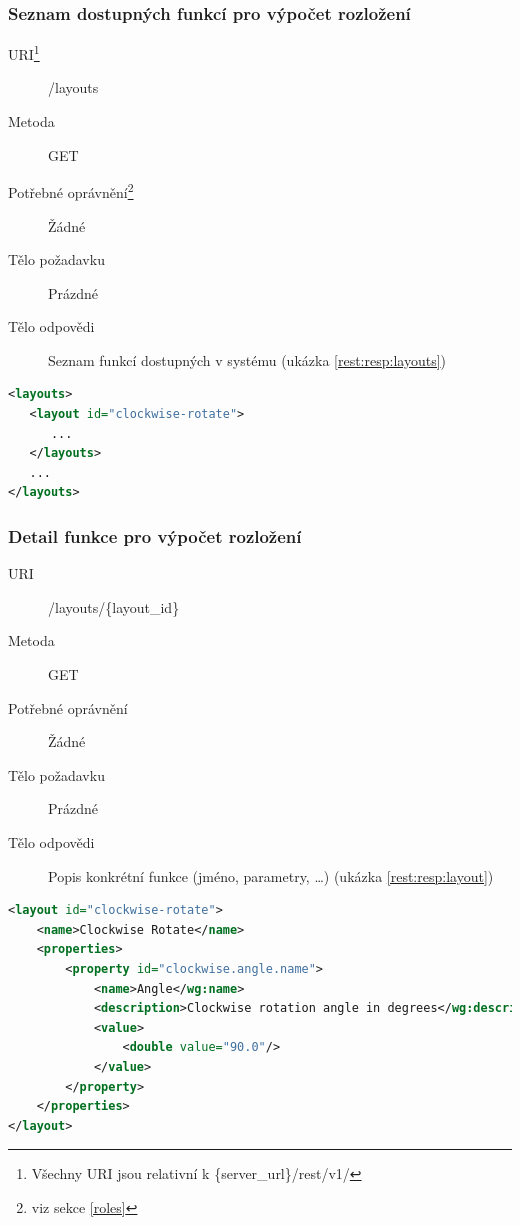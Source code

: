 \documentclass[thesis=M,czech]{FITthesis}[2014/05/6]
\begin{document}
\subsubsection{Seznam dostupných funkcí pro výpočet rozložení}
\begin{description}
  \item[URI\footnote{Všechny URI jsou relativní k \{server\_url\}/rest/v1/}] /layouts
  \item[Metoda] GET
  \item[Potřebné oprávnění\footnote{viz sekce \ref{roles}}] Žádné
  \item[Tělo požadavku] Prázdné
  \item[Tělo odpovědi] Seznam  funkcí dostupných v systému (ukázka \ref{rest:resp:layouts})
\end{description}

\begin{lstlisting}[caption=Tělo odpovědi zdroje /layouts (GET), label=rest:resp:layouts, language=xml]
<layouts>
   <layout id="clockwise-rotate">
      ...
   </layouts>
   ...
</layouts>
\end{lstlisting}  

\subsubsection{Detail funkce pro výpočet rozložení}
\begin{description}
  \item[URI] /layouts/\{layout\_id\}
  \item[Metoda] GET
  \item[Potřebné oprávnění] Žádné
  \item[Tělo požadavku] Prázdné
  \item[Tělo odpovědi] Popis konkrétní funkce (jméno, parametry, \ldots) (ukázka \ref{rest:resp:layout})
\end{description}

\begin{lstlisting}[caption=Tělo odpovědi zdroje /layouts/\{layout\_id\} (GET), label=rest:resp:layout, language=xml]
<layout id="clockwise-rotate">
    <name>Clockwise Rotate</name>
    <properties>
        <property id="clockwise.angle.name">
            <name>Angle</wg:name>
            <description>Clockwise rotation angle in degrees</wg:description>
            <value>
                <double value="90.0"/>
            </value>
        </property>
    </properties>   
</layout>
\end{lstlisting}    
\end{document}

